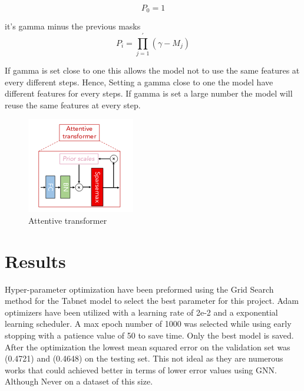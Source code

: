 \documentclass[10pt,twocolumn,letterpaper]{article}
\begin{document}
$$
P_{0}=1
$$

it's gamma minus the previous masks 
$$
P_{i}=\prod_{j=1}^{\prime}\left(\gamma-M_{j}\right)
$$

If gamma is set  close to one this allows the model not to use the same features at every different steps. Hence,  Setting a gamma close to one the model have different features for every steps. If gamma is set a large number the model will reuse the same features at every step. 





\begin{figure}[h!]
  \includegraphics[width=\linewidth]{tab3.png}
  \caption{Attentive transformer}
  \label{fig:tab3}
\end{figure}

\section{Results}
Hyper-parameter optimization have been preformed using the Grid Search method for the Tabnet model to select the best parameter for this project. Adam optimizers have been utilized with a learning rate of 2e-2 and a exponential learning scheduler. A max epoch number of 1000 was selected while using early stopping with a patience value of 50 to save time. Only the best model is saved. After the optimization the lowest mean squared error on the validation set was (0.4721) and (0.4648) on the testing set. This not ideal as they are numerous works that could achieved better in terms of lower error values using GNN. Although Never on a dataset of this size. 
\end{document}
